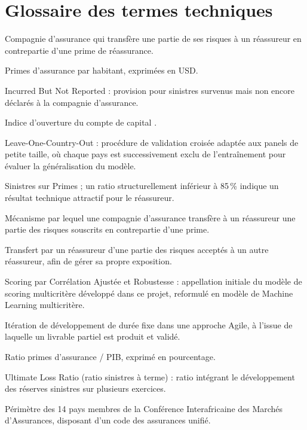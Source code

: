 \documentclass[12pt,a4paper]{report}
\begin{document}
\chapter{Glossaire des termes techniques}
\label{ann:glossaire}

\begin{description}[leftmargin=4cm, style=nextline]
  \item[Cédante] Compagnie d'assurance qui transfère une partie de ses risques à un
        réassureur en contrepartie d'une prime de réassurance.
  \item[Densité d'assurance] Primes d'assurance par habitant, exprimées en USD.
  \item[IBNR] Incurred But Not Reported : provision pour sinistres survenus mais non
        encore déclarés à la compagnie d'assurance.
  \item[Kaopen] Indice d'ouverture du compte de capital \citep{ChinnIto2006}.
  \item[LOCO] Leave-One-Country-Out : procédure de validation croisée adaptée aux
        panels de petite taille, où chaque pays est successivement exclu de
        l'entraînement pour évaluer la généralisation du modèle.
  \item[Ratio S/P] Sinistres sur Primes ; un ratio structurellement inférieur à
        85\,\% indique un résultat technique attractif pour le réassureur.
  \item[Réassurance] Mécanisme par lequel une compagnie d'assurance transfère à un
        réassureur une partie des risques souscrits en contrepartie d'une prime.
  \item[Rétrocession] Transfert par un réassureur d'une partie des risques acceptés
        à un autre réassureur, afin de gérer sa propre exposition.
  \item[SCAR] Scoring par Corrélation Ajustée et Robustesse : appellation initiale du modèle
        de scoring multicritère développé dans ce projet, reformulé en modèle de Machine Learning multicritère.
  \item[Sprint] Itération de développement de durée fixe dans une approche Agile,
        à l'issue de laquelle un livrable partiel est produit et validé.
  \item[Taux de pénétration] Ratio primes d'assurance / PIB, exprimé en pourcentage.
  \item[ULR] Ultimate Loss Ratio (ratio sinistres à terme) : ratio intégrant le
        développement des réserves sinistres sur plusieurs exercices.
  \item[Zone CIMA] Périmètre des 14 pays membres de la Conférence Interafricaine des
        Marchés d'Assurances, disposant d'un code des assurances unifié.
\end{description}
\end{document}
